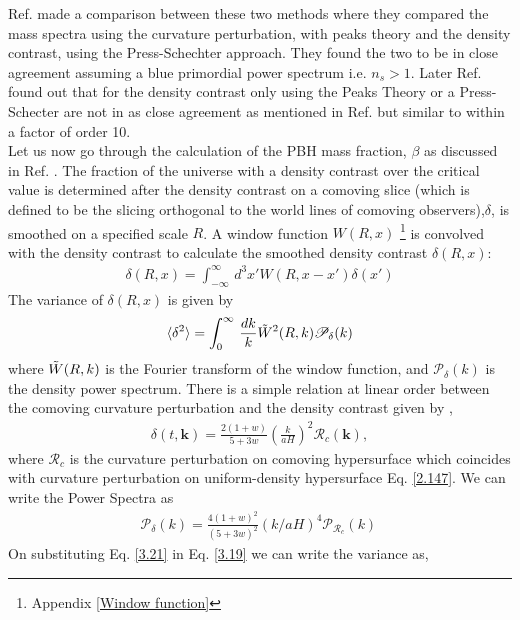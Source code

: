 Ref. \cite{PhysRevD.70.041502} made a comparison between these two methods where they compared the mass spectra using the curvature perturbation, with peaks theory and the density contrast, using the Press-Schechter approach. They found the two to be in close agreement  assuming a blue primordial power spectrum i.e. $n_{s} > 1$. Later Ref. \cite{Young_2014} found out that for the density contrast only using the Peaks Theory or a Press-Schecter are not in as close agreement as mentioned in Ref. \cite{PhysRevD.70.041502} but similar to within a factor of order 10. \\
Let us now go through the calculation of the PBH mass fraction, $\beta$ as discussed in Ref. \cite{Young_2014}. The fraction of the universe with a density contrast over the critical value is determined after the density contrast on a comoving slice (which is defined to be the slicing orthogonal to the world lines of comoving observers),$\delta$, is smoothed on a specified scale $R$. A window function $W(R,x)$ \footnote{Appendix \ref{Window function}} is convolved with the density contrast to calculate the smoothed density contrast $\delta(R,x)$:
\begin{align}
    \delta(R,x) = \int_{-\infty}^{\infty} \,d^{3}x'  W(R,x-x') \delta(x') \label{3.19}
\end{align}
The variance of  $\delta(R,x)$ is given by
\begin{align}
    \langle \delta^2 \rangle =  \int_{0}^{\infty} \,\frac{dk}{k}  \Tilde{W}^{2}(R,k) \mathcal{P_{\delta}}(k) \label{3.20}
\end{align}
where $\Tilde{W}(R,k)$ is the Fourier transform of the window function, and $\mathcal{P_{\delta}}(k)$ is the density power spectrum. There is a simple relation at linear order between the  comoving curvature perturbation and the density contrast given by \cite{2000cils.book.....L},
\begin{align}
    \delta(t,\mathbf{k}) = \frac{2(1+w)}{5+3w}\left(\frac{k}{aH}\right)^{2} \mathcal{R}_{c}(\mathbf{k}),\label{3.21}
\end{align}
where $\mathcal{R}_{c}$ is the curvature perturbation on comoving hypersurface which coincides with curvature perturbation on uniform-density hypersurface Eq. \ref{2.147}. We can write the Power Spectra as
\begin{align}
    \mathcal{P}_{\delta}(k) = \frac{4(1+w)^2}{(5+3w)^2}(k/aH)^4 \mathcal{P}_{\mathcal{R}_{c}}(k) \, \label{3.22}
\end{align}
On substituting Eq. \ref{3.21} in Eq. \ref{3.19} we can write the variance as,
